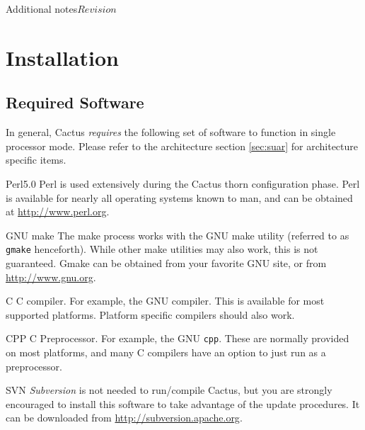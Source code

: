 
\begin{cactuspart}{Additional notes}{}{$Revision$}\label{part:Notes}
\renewcommand{\thepage}{\Alph{part}\arabic{page}}




\chapter{Installation}
\label{cha:in}


\section{Required Software}
\label{sec:required_software}

In general, Cactus \emph{requires} the following set of software to function
in single processor mode. Please refer to the architecture section
\ref{sec:suar} for architecture specific items.
\begin{Lentry}
\item[Perl5.0] Perl is used extensively during the Cactus
  thorn configuration phase. Perl is available for nearly all
  operating systems known to man, and can be obtained at
  \url{http://www.perl.org}.
\item[GNU make] The make
  process works with the GNU make utility (referred to as \texttt{gmake}
  henceforth). While other make utilities may also work, this is not
  guaranteed. Gmake can be obtained from your favorite GNU site, or
  from \url{http://www.gnu.org}.
\item[C] C compiler. For example, the GNU compiler. This
 is available for most supported platforms.  Platform specific compilers
 should also work.
\item[CPP] C Preprocessor. For example, the GNU \texttt{cpp}.  These are
  normally provided on most platforms, and many C compilers have an option
  to just run as a preprocessor.
\item[SVN] \textit{Subversion} is not needed
  to run/compile Cactus, but you are strongly encouraged to install
  this software to take advantage of the update procedures. It can be
  downloaded from \url{http://subversion.apache.org}.  
\end{Lentry}


\end{cactuspart}

